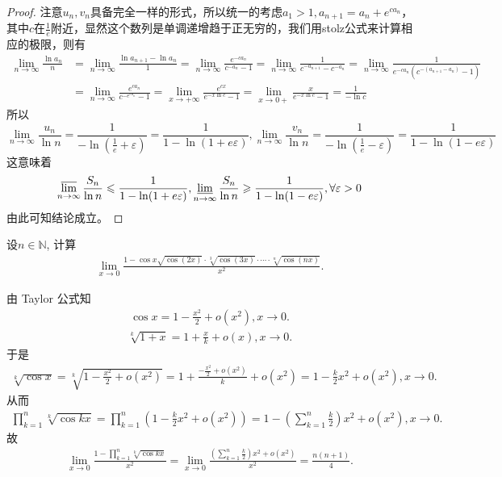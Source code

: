 \documentclass[../../main.tex]{subfiles}
\begin{document}
\begin{proof}
注意\(u_n,v_n\)具备完全一样的形式，所以统一的考虑\(a_1>1,a_{n + 1}=a_n + e^{ca_n}\)，其中\(c\)在\(\frac{1}{e}\)附近，显然这个数列是单调递增趋于正无穷的，我们用stolz公式来计算相应的极限，则有
\begin{align*}
\lim_{n\rightarrow\infty}\frac{\ln a_n}{n}&=\lim_{n\rightarrow\infty}\frac{\ln a_{n + 1}-\ln a_n}{1}=\lim_{n\rightarrow\infty}\frac{e^{-ca_n}}{c^{-a_n}-1}=\lim_{n\rightarrow\infty}\frac{1}{c^{-a_{n + 1}}-c^{-a_n}}=\lim_{n\rightarrow\infty}\frac{1}{e^{-ca_n}(c^{-(a_{n + 1}-a_n)}-1)}\\
&=\lim_{n\rightarrow\infty}\frac{e^{ca_n}}{c^{-e^{ca_n}}-1}=\lim_{x\rightarrow+\infty}\frac{e^{cx}}{e^{-x\ln c}-1}=\lim_{x\rightarrow0+}\frac{x}{e^{-x\ln c}-1}=\frac{1}{-\ln c}
\end{align*}
所以
\[\lim_{n\rightarrow\infty}\frac{u_n}{\ln n}=\frac{1}{-\ln(\frac{1}{e}+\varepsilon)}=\frac{1}{1-\ln(1 + e\varepsilon)},\lim_{n\rightarrow\infty}\frac{v_n}{\ln n}=\frac{1}{-\ln(\frac{1}{e}-\varepsilon)}=\frac{1}{1-\ln(1 - e\varepsilon)}\]
这意味着
\[\varlimsup_{n\rightarrow\infty}\frac{S_n}{\ln n}\leqslant \frac{1}{1-\ln(1 + e\varepsilon)},\varliminf_{n\rightarrow\infty}\frac{S_n}{\ln n}\geqslant \frac{1}{1-\ln(1 - e\varepsilon)},\forall\varepsilon>0\]
由此可知结论成立。

\end{proof}

\begin{example}
设$n \in \mathbb{N}$, 计算
\begin{align*}
\lim_{x \to 0} \frac{1 - \cos x \sqrt{\cos (2x)} \cdot \sqrt[3]{\cos (3x)} \cdot \cdots \cdot \sqrt[n]{\cos (nx)}}{x^2}.
\end{align*}
\end{example}
\begin{solution}
由 Taylor 公式知
\begin{align*}
\cos x = 1 - \frac{x^2}{2} + o(x^2), x \to 0.
\end{align*}
\begin{align*}
\sqrt[k]{1 + x} = 1 + \frac{x}{k} + o(x), x \to 0.
\end{align*}
于是
\begin{align*}
\sqrt[k]{\cos x} = \sqrt[k]{1 - \frac{x^2}{2} + o(x^2)} = 1 + \frac{-\frac{x^2}{2} + o(x^2)}{k} + o(x^2) = 1 - \frac{k}{2}x^2 + o(x^2), x \to 0.
\end{align*}
从而
\begin{align*}
\prod_{k=1}^n \sqrt[k]{\cos kx} = \prod_{k=1}^n \left( 1 - \frac{k}{2}x^2 + o(x^2) \right) = 1 - \left( \sum_{k=1}^n \frac{k}{2} \right) x^2 + o(x^2), x \to 0.
\end{align*}
故
\begin{align*}
\lim_{x \to 0} \frac{1 - \prod\limits_{k=1}^n \sqrt[k]{\cos kx}}{x^2} = \lim_{x \to 0} \frac{\left( \sum\limits_{k=1}^n \frac{k}{2} \right) x^2 + o(x^2)}{x^2} = \frac{n(n + 1)}{4}.
\end{align*}

\end{solution}
\end{document}
